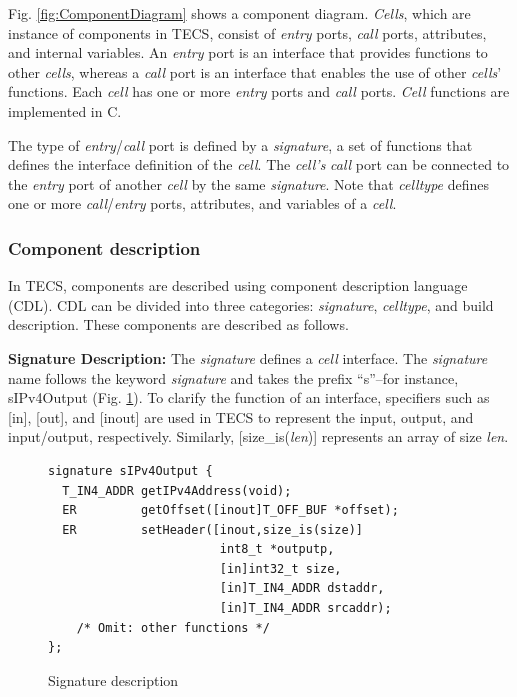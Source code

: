 \documentclass[conference]{IEEEtran/IEEEtran}
\begin{document}
Fig. \ref{fig:ComponentDiagram} shows a component diagram.
{\it Cells}, which are instance of components in TECS, consist of {\it entry} ports, {\it call} ports, attributes, and internal variables.
An {\it entry} port is an interface that provides functions to other {\it cells}, whereas a {\it call} port is an interface that enables the use of other {\it cells}' functions.
Each {\it cell} has one or more {\it entry} ports and {\it call} ports.
{\it Cell} functions are implemented in C.

The type of {\it entry}/{\it call} port is defined by a {\it signature}, a set of functions that defines the interface definition of the {\it cell}.
The {\it cell's} {\it call} port can be connected to the {\it entry} port of another {\it cell} by the same {\it signature}.
Note that {\it celltype} defines one or more {\it call}/{\it entry} ports, attributes, and variables of a {\it cell}.

\subsubsection{Component description}

In TECS, components are described using component description language (CDL).
CDL can be divided into three categories: {\it signature}, {\it celltype}, and build description.
These components are described as follows.

{\bf Signature Description:}
The {\it signature} defines a {\it cell} interface.
The {\it signature} name follows the keyword {\it signature} and takes the prefix ``s''--for instance, sIPv4Output (Fig. \ref{src:signature}).
To clarify the function of an interface, specifiers such as [in], [out], and [inout] are used in TECS to represent the input, output, and input/output, respectively.
Similarly, [size\_is({\it len})] represents an array of size {\it len}.

\begin{figure}[t]
\centering
\begin{lstlisting}
signature sIPv4Output {
  T_IN4_ADDR getIPv4Address(void);
  ER         getOffset([inout]T_OFF_BUF *offset);
  ER         setHeader([inout,size_is(size)]
                        int8_t *outputp,
                        [in]int32_t size,
                        [in]T_IN4_ADDR dstaddr,
                        [in]T_IN4_ADDR srcaddr);
    /* Omit: other functions */
};
\end{lstlisting}
\vspace{-1mm} \caption{Signature description}
\vspace{-1mm} \label{src:signature}
\end{figure}
\end{document}
